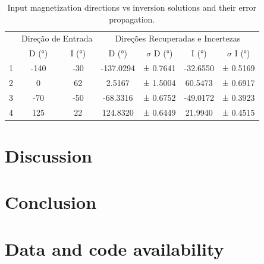 \begin{table}[htbp]
\caption{Input magnetization directions vs inversion solutions and their error propagation.}
\label{tab:inversionresults}
\centering
\begin{tabular}[width=1.0\textwidth]{ccccccc}
\rowcolor[HTML]{E7E7E7} 
\cellcolor[HTML]{E7E7E7}                         & \multicolumn{2}{c}{\cellcolor[HTML]{E7E7E7}Direção de Entrada} & \multicolumn{4}{c}{\cellcolor[HTML]{E7E7E7}Direções Recuperadas e   Incertezas} \\
\rowcolor[HTML]{E7E7E7} 
\multirow{-2}{*}{\cellcolor[HTML]{E7E7E7}Esfera} & D (°)                          & I (°)                         & D (°)               & $\sigma$ D (°)            & I (°)             & $\sigma$ I (°)           \\
1                                                & -140                           & -30                           & -137.0294           & ± 0.7641          & -32.6550          & ± 0.5169          \\
\rowcolor[HTML]{E7E7E7} 
2                                                & 0                              & 62                            & 2.5167              & ± 1.5004          & 60.5473           & ± 0.6917          \\
3                                                & -70                            & -50                           & -68.3316            & ± 0.6752          & -49.0172          & ± 0.3923          \\
\rowcolor[HTML]{E7E7E7} 
4                                                & 125                            & 22                            & 124.8320            & ± 0.6449          & 21.9940           & ± 0.4515         
\end{tabular}
\end{table}





\section{Discussion}

\section{Conclusion}



\section{Data and code availability}

